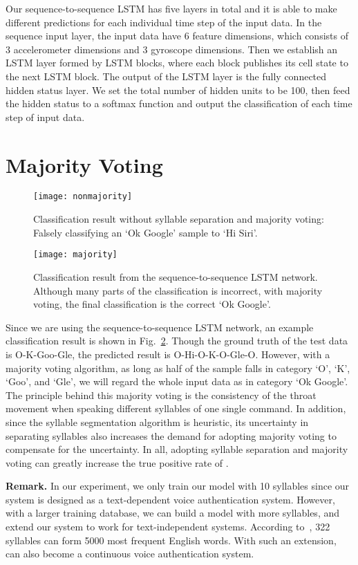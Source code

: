 Our sequence-to-sequence LSTM has five layers in total and it is able to make different predictions for each individual time step of the input data. In the sequence input layer, the input data have 6 feature dimensions, which consists of 3 accelerometer dimensions and 3 gyroscope dimensions. Then we establish an LSTM layer formed by LSTM blocks, where each block publishes its cell state to the next LSTM block. The output of the LSTM layer is the fully connected hidden status layer. We set the total number of hidden units to be 100, then feed the hidden status to a softmax function and output the classification of each time step of input data.


\section{Majority Voting}

\begin{figure}[t]
	\centering
		\centering
		\texttt{[image: nonmajority]}
		\caption{Classification result without syllable separation and majority voting: Falsely classifying an `Ok Google' sample to `Hi Siri'.}
		\label{fig:nonmajority}
\end{figure}
\begin{figure}[t]
		\centering
		\texttt{[image: majority]}
		\caption[Classification Result]{Classification result from the sequence-to-sequence LSTM network. Although many parts of the classification is incorrect, with majority voting, the final classification is the correct `Ok Google'. }
		\label{fig:majority}
\end{figure}


Since we are using the sequence-to-sequence LSTM network, an example classification result is shown in Fig.~\ref{fig:majority}. Though the ground truth of the test data is O-K-Goo-Gle, the predicted result is O-Hi-O-K-O-Gle-O. However, with a majority voting algorithm, as long as half of the sample falls in category `O', `K', `Goo', and `Gle', we will regard the whole input data as in category `Ok Google'. The principle behind this majority voting is the consistency of the throat movement when speaking different syllables of one single command. In addition, since the syllable segmentation algorithm is heuristic, its uncertainty in separating syllables also increases the demand for adopting majority voting to compensate for the uncertainty.
In all, adopting syllable separation and majority voting can greatly increase the true positive rate of {\shortname}. 


\textbf{Remark.} In our experiment, we only train our model with 10 syllables since our system is designed as a text-dependent voice authentication system. However, with a larger training database, we can build a model with more syllables, and extend our system to work for text-independent systems. According to~\cite{onlinelist}, 322 syllables can form 5000 most frequent English words. With such an extension, {\shortname} can also become a continuous voice authentication system.